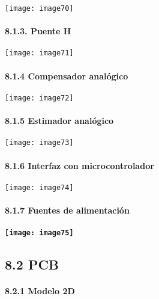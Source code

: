 \documentclass{article} %
\begin{document}
\noindent \texttt{[image: image70]}

\noindent 
\paragraph{8.1.3. Puente H}

\noindent 

\noindent \texttt{[image: image71]}

\noindent 

\noindent 
\paragraph{8.1.4 Compensador anal\'{o}gico}

\noindent 

\noindent \texttt{[image: image72]}

\noindent 
\paragraph{8.1.5 Estimador anal\'{o}gico}

\noindent \texttt{[image: image73]}\eject 

\noindent 
\paragraph{8.1.6 Interfaz con microcontrolador}

\noindent \texttt{[image: image74]}

\noindent 
\paragraph{8.1.7 Fuentes de alimentaci\'{o}n}

\noindent 
\paragraph{\texttt{[image: image75]}}

\noindent 
\subsection{8.2 PCB}

\noindent 
\paragraph{8.2.1 Modelo 2D}
\end{document}
